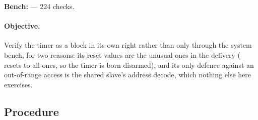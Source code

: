 \textbf{Bench:}  --- 224 checks.

\paragraph{Objective.} Verify the timer as a block in its own right rather than
only through the system bench, for two reasons: its reset values are the unusual
ones in the delivery ( resets to all-ones, so the timer is born
disarmed), and its only defence against an out-of-range access is the shared
slave's address decode, which nothing else here exercises.

\subsection*{Procedure}

